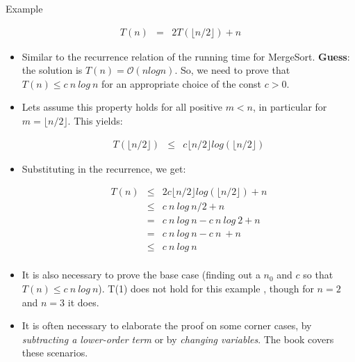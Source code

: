 \begin{frame}{Example}

\begin{eqnarray*}
    T(n)  & = &  2T(\lfloor n/2 \rfloor) + n
\end{eqnarray*}  \pause

\begin{itemize}
\item Similar to the recurrence relation of the running time for MergeSort. \pause
  {\bf Guess}: the solution is $T(n) = \mathcal{O}(n log n)$. \pause So, we need to prove
  that $T(n) \leq c\ n\ log\ n$ for an appropriate choice of the const $c > 0$.
\end{itemize}
\end{frame}

\begin{frame}
\begin{itemize}
\item Lets assume this property holds for all positive $m < n$, in particular for
  $m = \lfloor n/2 \rfloor$. \pause This yields:

  \begin{eqnarray*}
    T(\lfloor n/2 \rfloor) & \leq & c \lfloor n/2 \rfloor log (\lfloor n/2 \rfloor)
  \end{eqnarray*}
      
\item  Substituting in the recurrence, we get:

  \begin{small}
\begin{eqnarray*}
  T(n) & \leq & 2  c \lfloor n/2 \rfloor log (\lfloor n/2 \rfloor) + n \\
       & \leq & c\ n\ log\ n/2 + n              \\
       & =    & c\ n\ log\ n - c\ n\ log\ 2 + n    \\
       & =    & c\ n\ log\ n - c\ n\ + n          \\
       & \leq & c\ n\ log\ n                    \\ 
 \end{eqnarray*}
  \end{small}
\end{itemize}
\end{frame}

\begin{frame}

\begin{itemize}
  \item It is also necessary to prove the base case (finding out a $n_0$ and $c$
    so that $T(n) \leq c\ n\ log\ n$). \pause T(1) does not hold for this example \pause, though for $n=2$ and
    $n=3$ it does.

  \item It is often necessary to elaborate the proof on some corner cases, by \emph{subtracting a lower-order term} or by
    \emph{changing variables}. The book covers these scenarios.     
\end{itemize}
\end{frame}


